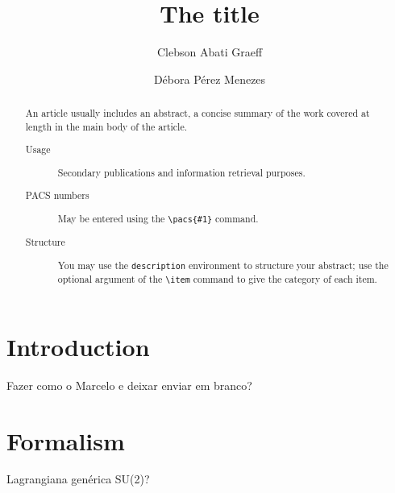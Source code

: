 \documentclass[prc, reprint, amsmath, linenumbers,10pt]{revtex4-1}
\begin{document}

%
%

\title{The title}

\author{Clebson Abati Graeff}

\author{Débora Pérez Menezes}


\begin{abstract}
An article usually includes an abstract, a concise summary of the work
covered at length in the main body of the article. 
\begin{description}
\item[Usage]
Secondary publications and information retrieval purposes.
\item[PACS numbers]
May be entered using the \verb+\pacs{#1}+ command.
\item[Structure]
You may use the \texttt{description} environment to structure your abstract;
use the optional argument of the \verb+\item+ command to give the category of each item. 
\end{description}
\end{abstract}




\maketitle

%
%

\section{Introduction}

Fazer como o Marcelo e deixar enviar em branco?

\section{Formalism}
Lagrangiana genérica SU(2)?
\end{document}
